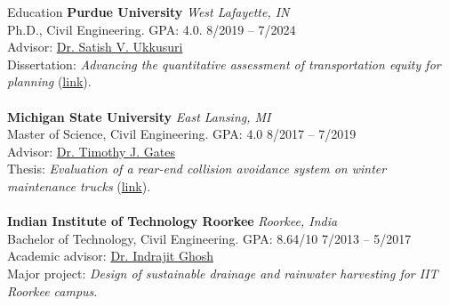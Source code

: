 \documentclass{CV} %
\begin{document}

\begin{rSection}{Education}
    {\bf Purdue University} \hfill {\em West Lafayette, IN}
    \\ Ph.D., Civil Engineering. GPA: 4.0. \hfill {8/2019 – 7/2024}
    \\ Advisor: \href{http://www.satishukkusuri.com/}{Dr. Satish V. Ukkusuri}
    \\ Dissertation: \emph{Advancing the quantitative assessment of transportation equity for planning} (\href{https://hammer.purdue.edu/articles/thesis/_b_Advancing_the_quantitative_assessment_of_transportation_equity_for_planning_b_/26321260}{link}). \\
    \\ {\bf Michigan State University} \hfill {\em East Lansing, MI} 
    \\ Master of Science, Civil Engineering. GPA: 4.0 \hfill {8/2017 – 7/2019}
    \\ Advisor: \href{https://www.egr.msu.edu/people/profile/gatestim}{Dr. Timothy J. Gates}
    \\ Thesis: \emph{Evaluation of a rear-end collision avoidance system on winter maintenance trucks} (\href{https://www.proquest.com/docview/2311960073?pq-origsite=gscholar&fromopenview=true&sourcetype=Dissertations%20&%20Theses}{link}). \\
    \\ {\bf Indian Institute of Technology Roorkee} \hfill {\em Roorkee, India}
    \\ Bachelor of Technology, Civil Engineering. GPA: 8.64/10 \hfill {7/2013 – 5/2017}
    \\ Academic advisor: \href{https://civil.iitr.ac.in/CE?Uid=indrafce}{Dr. Indrajit Ghosh}
    \\ Major project: \emph{Design of sustainable drainage and rainwater harvesting for IIT Roorkee campus}.
\end{rSection}
\end{document}
